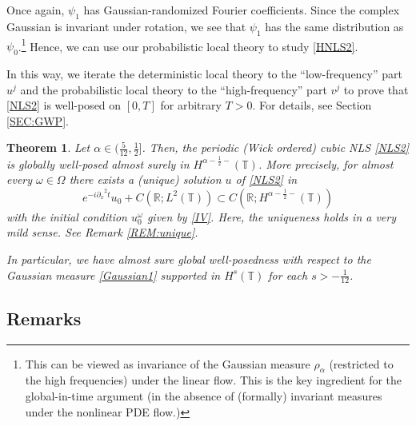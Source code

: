 \documentclass[11pt]{amsart}
\newtheorem{maintheorem}{Theorem}
\numberwithin{equation}{section} \numberwithin{theorem}{section}
\begin{document}
{
\noindent} Once again, $\psi_1$ has Gaussian-randomized Fourier coefficients.
Since the complex Gaussian is invariant under rotation, 
we see that $\psi_1$ has the same distribution as $\psi_0$.\footnote{This can be viewed as invariance
of the Gaussian measure $\rho_{\alpha}$ (restricted to the high frequencies) under the linear flow.
This is the key ingredient for the global-in-time argument (in the absence of (formally) invariant measures under the nonlinear PDE flow.)} 
Hence, we can use our probabilistic local theory to study \eqref{HNLS2}.

In this way, we iterate the deterministic local theory to the ``low-frequency'' part $u^j$ and the probabilistic local theory to the ``high-frequency'' part $v^j$ to prove that \eqref{NLS2} is well-posed on $[0, T]$ for arbitrary $T>0$. 
For details, see Section \ref{SEC:GWP}.
\begin{maintheorem}
	\label{THM:GWP1} Let ${\alpha} \in ( \frac{5}{12}, \frac{1}{2}]$. Then, the periodic (Wick ordered) cubic NLS \eqref{NLS2} is globally well-posed almost surely in $H^{{\alpha} - \frac{1}{2}-}(\mathbb{T})$. More precisely, for almost every $\omega \in \Omega$ there exists a (unique) solution $u$ of \eqref{NLS2} in
	\[e^{-i {
\partial_x}^2 t}u_0 + C({\mathbb{R}};L^2(\mathbb{T})) \subset C({\mathbb{R}};H^{{\alpha} - \frac{1}{2}-}(\mathbb{T}))\]
	with the initial condition $u_0^\omega$ given by \eqref{IV}.
	Here, the uniqueness holds in a very mild sense. See Remark \ref{REM:unique}.
	
	
	In particular, we have almost sure global well-posedness with respect to the Gaussian measure \eqref{Gaussian1} supported in $H^{s}(\mathbb{T})$ for each $s > -\frac{1}{12}$. 
\end{maintheorem}

\subsection{Remarks}
\end{document}
